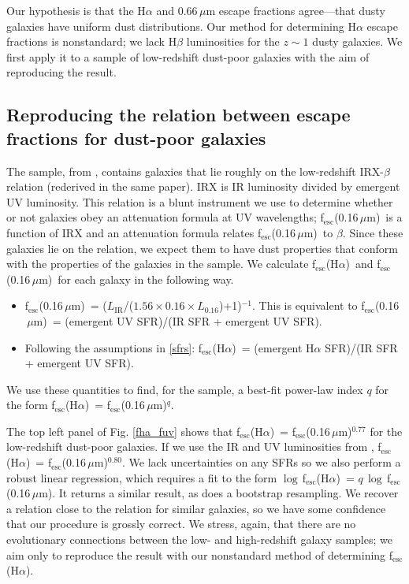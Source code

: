 \documentclass[referee]{aa}
\newcommand{\alephuv}{f$_{\mathrm{esc}}$(0.16$\,\mu$m)}
\newcommand{\alephha}{f$_{\mathrm{esc}}$(H$\alpha$)}
\newcommand{\alephuvha}{f$_{\mathrm{esc}}$(0.66$\,\mu$m)}
\begin{document}
Our hypothesis is that the H$\alpha$ and 0.66$\,\mu$m escape fractions
agree---that dusty galaxies have uniform dust distributions.
Our method for determining H$\alpha$ escape fractions is nonstandard; we lack
H$\beta$ luminosities for the $z \sim 1$ dusty galaxies.  We first apply
it to a sample of low-redshift dust-poor galaxies with the aim of reproducing
the \citet{calzetti97b} result.

\subsection{Reproducing the relation between escape fractions for dust-poor
galaxies}

The sample, from \citet{overzier11}, contains galaxies that lie roughly on
the low-redshift IRX-$\beta$ relation (rederived in the same paper).  IRX
is IR luminosity divided by emergent UV luminosity.  This
relation is a blunt instrument we
use to determine whether or not galaxies obey an attenuation formula at UV
wavelengths; \alephuv~is a function of IRX and an attenuation formula relates
\alephuv~to $\beta$.  Since these galaxies lie on the relation, we
expect them to have dust properties that conform with the properties of
the galaxies in the \citet{calzetti00} sample.  We calculate \alephha~and
\alephuv~for each galaxy in the following way.
\begin{itemize}
\item \alephuv~= ($L_{\mathrm{IR}}$/($1.56\times0.16\times
L_{\mathrm{0.16}}$)+1)$^{-1}$.  This is equivalent to \alephuv~= (emergent UV
SFR)/(IR SFR + emergent UV SFR).
\item Following the assumptions in \ref{sfrs}: \alephha~=
(emergent H$\alpha$ SFR)/(IR SFR + emergent UV SFR).
\end{itemize}
We use these quantities to find, for the sample, a best-fit power-law index $q$
for the form \alephha~= \alephuv$^{q}$.

The top left panel of Fig. \ref{fha_fuv} shows that \alephha~= \alephuv$^{0.77}$
for the low-redshift
dust-poor galaxies.  If we use the IR and UV luminosities from
\citealt{overzier11}, \alephha~= \alephuv$^{0.80}$.  We lack
uncertainties on any SFRs so we also perform a robust linear regression,
which requires a fit to the form $\log\,$\alephha~= $q\,\log\,$\alephuv.  It
returns a similar result, as does a bootstrap resampling.  We recover a relation
close to the
\citet{calzetti97b} relation for similar galaxies, so we have some confidence
that our procedure is grossly correct.  We stress, again, that there are
no evolutionary connections between the low- and high-redshift galaxy samples;
we aim only to reproduce the \citet{calzetti97b} result with our nonstandard
method of determining \alephha.
\end{document}
